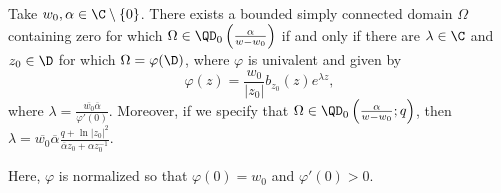 \documentclass{article}
\numberwithin{equation}{section}
\begin{document}
\begin{theorem}\label{thm:BoundedSingularOnePtLQD}
Take $w_0,\alpha\in\C\setminus\{0\}$. There exists a bounded simply connected domain $\Omega$ containing zero for which $\Omega\in\QD_0\left(\frac{\alpha}{w-w_0}\right)$ if and only if there are $\lambda\in\C$ and $z_0\in\D$ for which $\Omega=\varphi(\D)$, where $\varphi$ is univalent and given by
\begin{equation}\label{eqn:BoundedSingularOnePtLQD}
    \varphi(z)=\dfrac{w_0}{|z_0|}b_{z_0}(z)e^{\lambda z},
\end{equation}
where $\lambda=\frac{\overline{w_0}\overline{\alpha}}{\varphi'(0)}$. Moreover, if we specify that $\Omega\in\QD_0\left(\frac{\alpha}{w-w_0};q\right)$, then $\lambda=\overline{w_0}\overline{\alpha}\frac{q+\ln|z_0|^2}{\overline{\alpha}z_0+\alpha z_0^{-1}}$.
\end{theorem}
Here, $\varphi$ is normalized so that $\varphi(0)=w_0$ and $\varphi'(0)>0$.
\end{document}
